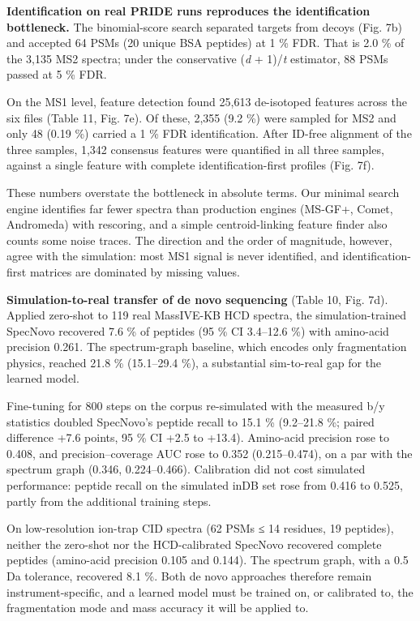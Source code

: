 \documentclass[
]{article}
\begin{document}
\textbf{Identification on real PRIDE runs reproduces the identification
bottleneck.} The binomial-score search separated targets from decoys
(Fig. 7b) and accepted 64 PSMs (20 unique BSA peptides) at 1 \% FDR.
That is 2.0 \% of the 3,135 MS2 spectra; under the conservative
(\emph{d} + 1)/\emph{t} estimator, 88 PSMs passed at 5 \% FDR.

On the MS1 level, feature detection found 25,613 de-isotoped features
across the six files (Table 11, Fig. 7e). Of these, 2,355 (9.2 \%) were
sampled for MS2 and only 48 (0.19 \%) carried a 1 \% FDR identification.
After ID-free alignment of the three samples, 1,342 consensus features
were quantified in all three samples, against a single feature with
complete identification-first profiles (Fig. 7f).

These numbers overstate the bottleneck in absolute terms. Our minimal
search engine identifies far fewer spectra than production engines
(MS-GF+, Comet, Andromeda) with rescoring, and a simple centroid-linking
feature finder also counts some noise traces. The direction and the
order of magnitude, however, agree with the simulation: most MS1 signal
is never identified, and identification-first matrices are dominated by
missing values.

\textbf{Simulation-to-real transfer of de novo sequencing} (Table 10,
Fig. 7d). Applied zero-shot to 119 real MassIVE-KB HCD spectra, the
simulation-trained SpecNovo recovered 7.6 \% of peptides (95 \% CI
3.4--12.6 \%) with amino-acid precision 0.261. The spectrum-graph
baseline, which encodes only fragmentation physics, reached 21.8 \%
(15.1--29.4 \%), a substantial sim-to-real gap for the learned model.

Fine-tuning for 800 steps on the corpus re-simulated with the measured
b/y statistics doubled SpecNovo's peptide recall to 15.1 \% (9.2--21.8
\%; paired difference +7.6 points, 95 \% CI +2.5 to +13.4). Amino-acid
precision rose to 0.408, and precision--coverage AUC rose to 0.352
(0.215--0.474), on a par with the spectrum graph (0.346, 0.224--0.466).
Calibration did not cost simulated performance: peptide recall on the
simulated inDB set rose from 0.416 to 0.525, partly from the additional
training steps.

On low-resolution ion-trap CID spectra (62 PSMs ≤ 14 residues, 19
peptides), neither the zero-shot nor the HCD-calibrated SpecNovo
recovered complete peptides (amino-acid precision 0.105 and 0.144). The
spectrum graph, with a 0.5 Da tolerance, recovered 8.1 \%. Both de novo
approaches therefore remain instrument-specific, and a learned model
must be trained on, or calibrated to, the fragmentation mode and mass
accuracy it will be applied to.
\end{document}
